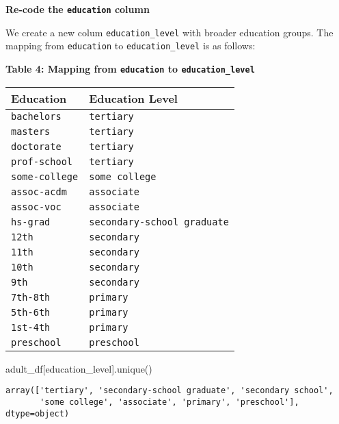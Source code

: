 \documentclass[
  letterpaper,
  DIV=11,
  numbers=noendperiod]{scrartcl}
\newenvironment{Shaded}{\begin{snugshade}}{\end{snugshade}}
\newcommand{\NormalTok}[1]{\textcolor[rgb]{0.00,0.23,0.31}{#1}}
\newcommand{\StringTok}[1]{\textcolor[rgb]{0.13,0.47,0.30}{#1}}
\begin{document}
\textbf{Re-code the \texttt{education} column}

We create a new colum \texttt{education\_level} with broader education
groups. The mapping from \texttt{education} to \texttt{education\_level}
is as follows:

\textbf{Table 4: Mapping from \texttt{education} to
\texttt{education\_level}}

\begin{longtable}[]{@{}ll@{}}
\toprule\noalign{}
Education & Education Level \\
\midrule\noalign{}
\endhead
\bottomrule\noalign{}
\endlastfoot
\texttt{bachelors} & \texttt{tertiary} \\
\texttt{masters} & \texttt{tertiary} \\
\texttt{doctorate} & \texttt{tertiary} \\
\texttt{prof-school} & \texttt{tertiary} \\
\texttt{some-college} & \texttt{some\ college} \\
\texttt{assoc-acdm} & \texttt{associate} \\
\texttt{assoc-voc} & \texttt{associate} \\
\texttt{hs-grad} & \texttt{secondary-school\ graduate} \\
\texttt{12th} & \texttt{secondary} \\
\texttt{11th} & \texttt{secondary} \\
\texttt{10th} & \texttt{secondary} \\
\texttt{9th} & \texttt{secondary} \\
\texttt{7th-8th} & \texttt{primary} \\
\texttt{5th-6th} & \texttt{primary} \\
\texttt{1st-4th} & \texttt{primary} \\
\texttt{preschool} & \texttt{preschool} \\
\end{longtable}

\begin{Shaded}
\begin{Highlighting}[]
\NormalTok{adult\_df[}\StringTok{\textquotesingle{}education\_level\textquotesingle{}}\NormalTok{].unique()}
\end{Highlighting}
\end{Shaded}

\begin{verbatim}
array(['tertiary', 'secondary-school graduate', 'secondary school',
       'some college', 'associate', 'primary', 'preschool'], dtype=object)
\end{verbatim}
\end{document}
